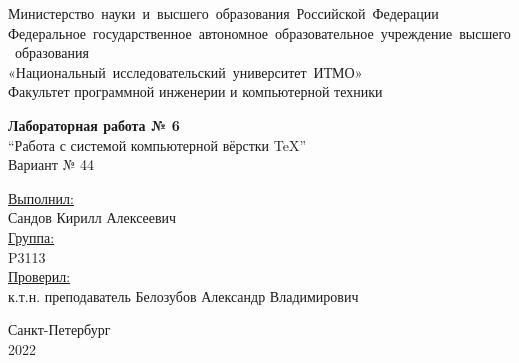 \begin{titlepage}

\fontsize{14pt}{14pt}\selectfont
\begin{center}
Министерство~науки~и~высшего~образования~Российской~Федерации
Федеральное~государственное~автономное~образовательное~учреждение~высшего~образования\\
«Национальный~исследовательский~университет~ИТМО»\\
\vspace{5mm}
Факультет программной инженерии и компьютерной техники

\vspace{9cm}

\textbf{Лабораторная работа № 6} \\
\vspace{5mm}
``Работа с системой компьютерной вёрстки \TeX''\\
\vspace{5mm}
Вариант № 44

\vfill
\end{center}

\raggedleft
\underline{Выполнил:}\\
Сандов Кирилл Алексеевич\\
\underline{Группа:}\\
P3113\\
\underline{Проверил:}\\
к.т.н. преподаватель Белозубов Александр Владимирович

\vfill
\begin{center}
Санкт-Петербург\\
2022
\end{center}

\thispagestyle{empty}

\end{titlepage}

